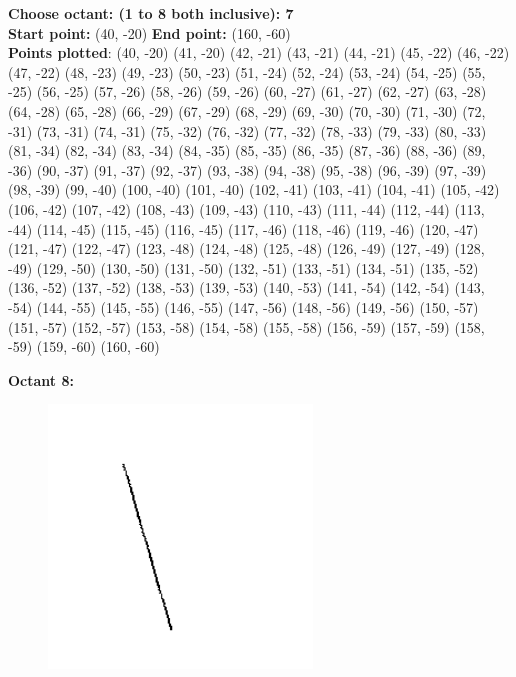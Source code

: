 \documentclass[12pt,letterpaper]{article}
\begin{document}
\textbf{Choose octant: (1 to 8 both inclusive): 7}\\
\textbf{Start point:} (40, -20)
\textbf{End point:} (160, -60)\\
\textbf{Points plotted}:
(40, -20) (41, -20) (42, -21) (43, -21) 
(44, -21) (45, -22) (46, -22) (47, -22) 
(48, -23) (49, -23) (50, -23) (51, -24) 
(52, -24) (53, -24) (54, -25) (55, -25) 
(56, -25) (57, -26) (58, -26) (59, -26) 
(60, -27) (61, -27) (62, -27) (63, -28) 
(64, -28) (65, -28) (66, -29) (67, -29) 
(68, -29) (69, -30) (70, -30) (71, -30) 
(72, -31) (73, -31) (74, -31) (75, -32) 
(76, -32) (77, -32) (78, -33) (79, -33) 
(80, -33) (81, -34) (82, -34) (83, -34) 
(84, -35) (85, -35) (86, -35) (87, -36) 
(88, -36) (89, -36) (90, -37) (91, -37) 
(92, -37) (93, -38) (94, -38) (95, -38) 
(96, -39) (97, -39) (98, -39) (99, -40) 
(100, -40) (101, -40) (102, -41) (103, -41) 
(104, -41) (105, -42) (106, -42) (107, -42) 
(108, -43) (109, -43) (110, -43) (111, -44) 
(112, -44) (113, -44) (114, -45) (115, -45) 
(116, -45) (117, -46) (118, -46) (119, -46) 
(120, -47) (121, -47) (122, -47) (123, -48) 
(124, -48) (125, -48) (126, -49) (127, -49) 
(128, -49) (129, -50) (130, -50) (131, -50) 
(132, -51) (133, -51) (134, -51) (135, -52) 
(136, -52) (137, -52) (138, -53) (139, -53) 
(140, -53) (141, -54) (142, -54) (143, -54) 
(144, -55) (145, -55) (146, -55) (147, -56) 
(148, -56) (149, -56) (150, -57) (151, -57) 
(152, -57) (153, -58) (154, -58) (155, -58) 
(156, -59) (157, -59) (158, -59) (159, -60) 
(160, -60) 

\newpage
\textbf{Octant 8:}
\begin{figure}[h]
    \centering
    \includegraphics[height=7cm]{Outputs/O8.png}
\end{figure}
\end{document}
